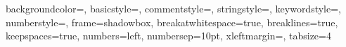      {                              %
        backgroundcolor=\color{white},                              %
        basicstyle=\tiny\color{BlueGrey800MD},                      %
        commentstyle=\color{IndigoMD},                              %
        stringstyle=\color{TealMD},                                 %
        keywordstyle=\color{DeepPurpleMD},                          %
        numberstyle=\tiny\color{TealMD},                            %
        frame=shadowbox,                                            %
        breakatwhitespace=true,                                     %
        breaklines=true,                                            %
        keepspaces=true,                                            %
        numbers=left,                                               %
        numbersep=10pt,                                             %
        xleftmargin=\parindent,                                     %
        tabsize=4                                                   %
    }
 
    \lstset{style=CompilandoStyle}                                  %









